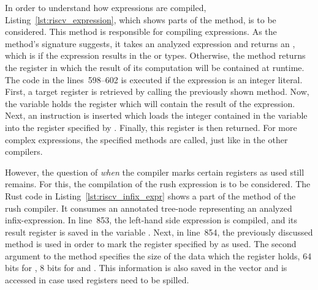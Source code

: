 
In order to understand how expressions are compiled, Listing~\ref{lst:riscv_expression}, which shows parts of the  method, is to be considered.
This method is responsible for compiling expressions.
As the method's signature suggests, it takes an analyzed expression and returns an ,
which is  if the expression results in the \qVerb{!} or \qVerb{()} types.
Otherwise, the method returns the register in which the result of its computation will be contained at runtime.
The code in the lines~598--602 is executed if the expression is an integer literal.
First, a target register is retrieved by calling the previously shown  method.
Now, the  variable holds the register which will contain the result of the expression.
Next, an  instruction is inserted which loads the integer contained in the variable  into the register specified by .
Finally, this register is then returned.
For more complex expressions, the specified methods are called, just like in the other compilers.

However, the question of \emph{when} the compiler marks certain registers as used still remains.
For this, the compilation of the rush expression  is to be considered.
The Rust code in Listing~\ref{lst:riscv_infix_expr} shows a part of the  method of the rush compiler.%
%
%
It consumes an annotated tree-node representing an analyzed infix-expression.
In line~853, the left-hand side expression is compiled, and its result register is saved in the variable .
Next, in line~854, the previously discussed  method is used in order to mark the register specified by  as used.
The second argument to the method specifies the size of the data which the register holds, 64 bits for , 8 bits for  and .
This information is also saved in the  vector and is accessed in case used registers need to be spilled.

